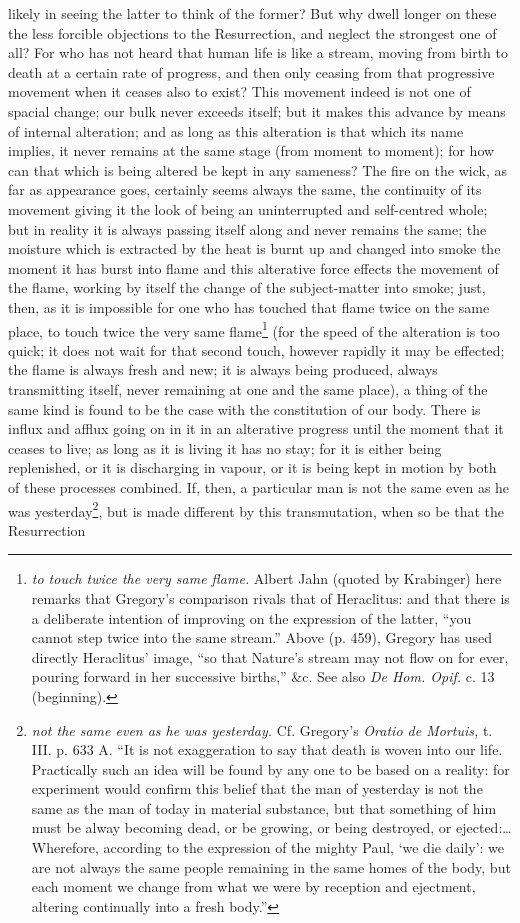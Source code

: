likely in seeing the latter to think of the former? But why dwell longer on these the less forcible objections to the Resurrection, and neglect the strongest one of all? For who has not heard that human life is like a stream, moving from birth to death at a certain rate of progress, and then only ceasing from that progressive movement when it ceases also to exist? This movement indeed is not one of spacial change; our bulk never exceeds itself; but it makes this advance by means of internal alteration; and as long as this alteration is that which its name implies, it never remains at the same stage (from moment to moment); for how can that which is being altered be kept in any sameness? The fire on the wick, as far as appearance goes, certainly seems always the same, the continuity of its movement giving it the look of being an uninterrupted and self-centred whole; but in reality it is always passing itself along and never remains the same; the moisture which is extracted by the heat is burnt up and changed into smoke the moment it has burst into flame and this alterative force effects the movement of the flame, working by itself the change of the subject-matter into smoke; just, then, as it is impossible for one who has touched that flame twice on the same place, to touch twice the very same flame\footnote{\emph{to touch twice the very same flame.} Albert Jahn (quoted by Krabinger) here remarks that Gregory’s comparison rivals that of Heraclitus: and that there is a deliberate intention of improving on the expression of the latter, “you cannot step twice into the same stream.” Above (p. 459), Gregory has used directly Heraclitus’ image, “so that Nature’s stream may not flow on for ever, pouring forward in her successive births,” \&c. See also \emph{De Hom. Opif.} c. 13 (beginning).} (for the speed of the alteration is too quick; it does not wait for that second touch, however rapidly it may be effected; the flame is always fresh and new; it is always being produced, always transmitting itself, never remaining at one and the same place), a thing of the same kind is found to be the case with the constitution of our body. There is influx and afflux going on in it in an alterative progress until the moment that it ceases to live; as long as it is living it has no stay; for it is either being replenished, or it is discharging in vapour, or it is being kept in motion by both of these processes combined. If, then, a particular man is not the same even as he was yesterday\footnote{\emph{not the same even as he was yesterday.} Cf. Gregory’s \emph{Oratio de Mortuis,} t. III. p. 633 A. “It is not exaggeration to say that death is woven into our life. Practically such an idea will be found by any one to be based on a reality: for experiment would confirm this belief that the man of yesterday is not the same as the man of today in material substance, but that something of him must be alway becoming dead, or be growing, or being destroyed, or ejected:…Wherefore, according to the expression of the mighty Paul, ‘we die daily’: we are not always the same people remaining in the same homes of the body, but each moment we change from what we were by reception and ejectment, altering continually into a fresh body.”}, but is made different by this transmutation, when so be that the Resurrection 
